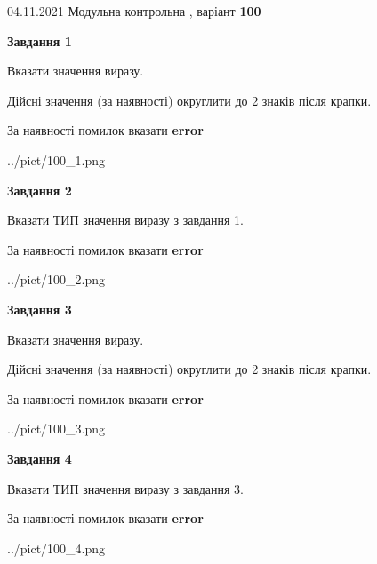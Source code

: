 \documentclass[11pt, ukrainian]{article}
\begin{document}
{04.11.2021 Модульна контрольна , варіант  \No \textbf { 100 }\par}
{
\begin {large}
{\begin {center}\textbf{Завдання 1}\end {center}}\par
Вказати значення виразу. \par
Дійсні значення (за наявності) округлити до 2 знаків після крапки. \par
За наявності помилок вказати \textbf{error}

\begin{center}
	{../pict/100_1.png}
\end{center}
\newpage

{\begin {center}\textbf{Завдання 2}\end {center}}\par
Вказати ТИП значення виразу з завдання 1. \par
За наявності помилок вказати \textbf{error}

\begin{center}
	{../pict/100_2.png}
\end{center}
\newpage

{\begin {center}\textbf{Завдання 3}\end {center}}\par
Вказати значення виразу. \par
Дійсні значення (за наявності) округлити до 2 знаків після крапки. \par
За наявності помилок вказати \textbf{error}

\begin{center}
	{../pict/100_3.png}
\end{center}
\newpage

{\begin {center}\textbf{Завдання 4}\end {center}}\par
Вказати ТИП значення виразу з завдання 3. \par
За наявності помилок вказати \textbf{error}

\begin{center}
	{../pict/100_4.png}
\end{center}
\newpage


\end{large}}
\end{document}
